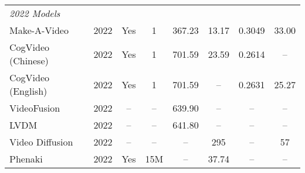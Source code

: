 \begin{longtable}{lccccccc}
    \multicolumn{8}{l}{\textit{2022 Models}} \\
    Make-A-Video \cite{singer2022makeavideo} & 2022 & Yes & 1 & 367.23 & 13.17 & 0.3049 & 33.00 \\
    CogVideo (Chinese) \cite{hong2022cogvideo} & 2022 & Yes & 1 & 701.59 & 23.59 & 0.2614 & -- \\
    CogVideo (English) \cite{hong2022cogvideo} & 2022 & Yes & 1 & 701.59 & -- & 0.2631 & 25.27 \\
    VideoFusion \cite{luo2023videofusion} & 2022 & -- & -- & 639.90 & -- & -- & -- \\
    LVDM \cite{he2022lvdm} & 2022 & -- & -- & 641.80 & -- & -- & -- \\
    Video Diffusion \cite{ho2022video} & 2022 & -- & -- & -- & 295 & -- & 57 \\
    Phenaki \cite{villegas2022phenaki} & 2022 & Yes & 15M & -- & 37.74 & -- & -- \\
    

\end{longtable}
